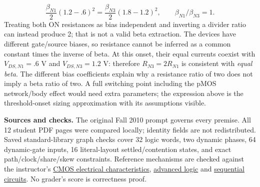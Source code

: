 \documentclass[10pt]{article}
\begin{document}
\[\frac{\beta_{N1}}2(1.2-.6)^2=\frac{\beta_{N3}}2(1.8-1.2)^2,
\qquad\boxed{\beta_{N1}/\beta_{N3}=1}.\]
Treating both ON resistances as bias independent and inverting a divider ratio can instead produce 2; that is not a valid beta extraction. The devices have different gate/source biases, so resistance cannot be inferred as a common constant times the inverse of beta. At this onset, their equal currents coexist with $V_{DS,N1}=.6$ V and $V_{DS,N3}=1.2$ V: therefore $R_{N3}=2R_{N1}$ is consistent with \emph{equal beta}. The different bias coefficients explain why a resistance ratio of two does not imply a beta ratio of two. A full switching point including the pMOS network/body effect would need extra parameters; the expression above is the threshold-onset sizing approximation with its assumptions visible.

\textbf{Sources and checks.} The original Fall 2010 prompt governs every premise. All 12 student PDF pages were compared locally; identity fields are not redistributed. Saved standard-library graph checks cover 32 logic words, two dynamic phases, 64 dynamic-gate inputs, 16 literal-layout settled/contention states, and exact path/clock/share/skew constraints. Reference mechanisms are checked against the instructor's \href{https://www.ee.ncu.edu.tw/jfli/public_html/VLSI/lecture/ch04.pdf}{CMOS electrical characteristics}, \href{https://www.ee.ncu.edu.tw/jfli/public_html/VLSI/lecture/ch06.pdf}{advanced logic} and \href{https://www.ee.ncu.edu.tw/jfli/public_html/VLSI/lecture/ch07.pdf}{sequential circuits}. No grader's score is correctness proof.
\end{document}
